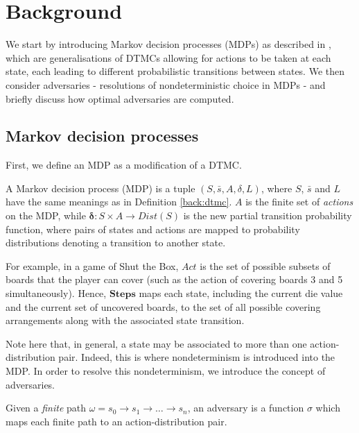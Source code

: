 \section{Background}
\label{cs1:stb_background}

We start by introducing Markov decision processes (MDPs) as described in \cite{forejt_automated_2011}, which are generalisations of DTMCs allowing for actions to be taken at each state, each leading to different probabilistic transitions between states. We then consider adversaries - resolutions of nondeterministic choice in MDPs - and briefly discuss how optimal adversaries are computed.

\subsection{Markov decision processes}
\label{cs1:mdps}
First, we define an MDP as a modification of a DTMC.

\begin{definition}
\label{cs1:def_mdps}

A Markov decision process (MDP) is a tuple $(S, \bar{s}, A, \delta, L)$, where $S$, $\bar{s}$ and $L$ have the same meanings as in Definition \ref{back:dtmc}. $A$ is the finite set of \emph{actions} on the MDP, while  $\mathbf{\delta} : S \times A \rightarrow Dist(S)$ is the new partial transition probability function, where pairs of states and actions are mapped to probability distributions denoting a transition to another state.

\end{definition}

For example, in a game of Shut the Box, $Act$ is the set of possible subsets of boards that the player can cover (such as the action of covering boards 3 and 5 simultaneously). Hence, $\mathbf{Steps}$ maps each state, including the current die value and the current set of uncovered boards, to the set of all possible covering arrangements along with the associated state transition.

Note here that, in general, a state may be associated to more than one action-distribution pair. Indeed, this is where nondeterminism is introduced into the MDP. In order to resolve this nondeterminism, we introduce the concept of adversaries.

\begin{definition}
\label{cs1:adversaries}

Given a \emph{finite} path $\omega = s_0 \rightarrow s_1 \rightarrow \dots \rightarrow s_n$, an adversary is a function $\sigma$ which maps each finite path to an action-distribution pair.

\end{definition}


